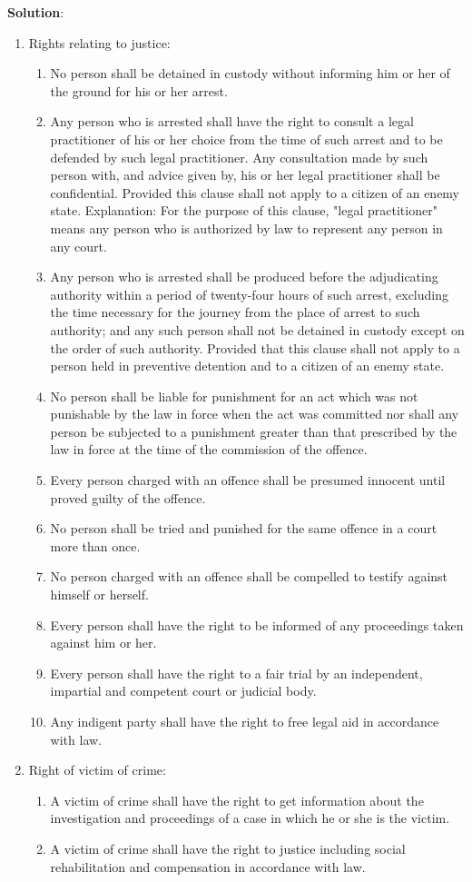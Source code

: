 \documentclass[
]{book}
\newenvironment{solution}{ {\bfseries Solution}:}{}
\begin{document}
\begin{questions}
\begin{solution}
\begin{enumerate}
\item Rights relating to justice:
\begin{enumerate}
\item No person shall be detained in custody without informing him or her of the ground for his or her arrest.
\item Any person who is arrested shall have the right to consult a legal practitioner of his or her choice from the time of such arrest and to be defended by such legal practitioner. Any consultation made by such person with, and advice given by, his or her legal practitioner shall be confidential. Provided this clause shall not apply to a citizen of an enemy state. Explanation: For the purpose of this clause, "legal practitioner" means any person who is authorized by law to represent any person in any court.
\item Any person who is arrested shall be produced before the adjudicating authority within a period of twenty-four hours of such arrest, excluding the time necessary for the journey from the place of arrest to such authority; and any such person shall not be detained in custody except on the order of such authority. Provided that this clause shall not apply to a person held in preventive detention and to a citizen of an enemy state.
\item No person shall be liable for punishment for an act which was not punishable by the law in force when the act was committed nor shall any person be subjected to a punishment greater than that prescribed by the law in force at the time of the commission of the offence.
\item Every person charged with an offence shall be presumed innocent until proved guilty of the offence.
\item No person shall be tried and punished for the same offence in a court more than once.
\item No person charged with an offence shall be compelled to testify against himself or herself.
\item Every person shall have the right to be informed of any proceedings taken against him or her.
\item Every person shall have the right to a fair trial by an independent, impartial and competent court or judicial body.
\item Any indigent party shall have the right to free legal aid in accordance with law.
\end{enumerate}

\item Right of victim of crime:
\begin{enumerate}
\item A victim of crime shall have the right to get information about the investigation and proceedings of a case in which he or she is the victim.
\item A victim of crime shall have the right to justice including social rehabilitation and compensation in accordance with law.
\end{enumerate}


\end{enumerate}
\end{solution}
\end{questions}
\end{document}
